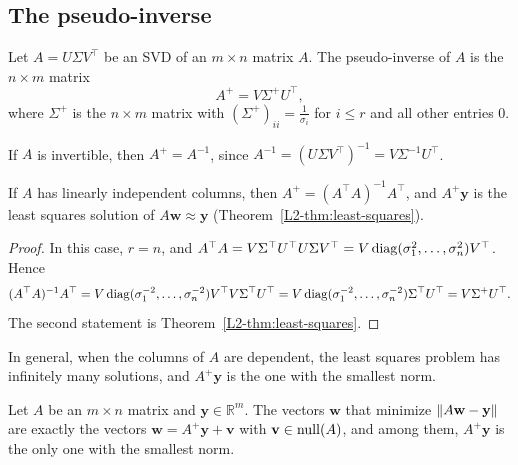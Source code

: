 \subsection{The pseudo-inverse}

\begin{definition}
    Let $A = U\Sigma V^\top$ be an SVD of an $m \times n$ matrix $A$. The pseudo-inverse of $A$ is the $n \times m$ matrix
    \[A^+ = V \Sigma^+ U^\top,\]
    where $\Sigma^+$ is the $n \times m$ matrix with $(\Sigma^+)_{ii} = \frac{1}{\sigma_i}$ for $i \leq r$ and all other entries $0$.
\end{definition}

If $A$ is invertible, then $A^+ = A^{-1}$, since $A^{-1} = (U\Sigma V^\top)^{-1} = V\Sigma^{-1}U^\top$.

\begin{proposition}\label{L2-prop:pinv}
    If $A$ has linearly independent columns, then $A^+ = (A^\top A)^{-1} A^\top$, and $A^+ \mathbf{y}$ is the least squares solution of $A\mathbf{w} \approx \mathbf{y}$ (Theorem~\ref{L2-thm:least-squares}).
\end{proposition}

\begin{proof}
    In this case, $r = n$, and $A^\top A = V\Sigma^\top U^\top U \Sigma V^\top = V \operatorname{diag}(\sigma_1^2, \ldots, \sigma_n^2) V^\top$. Hence
    \[(A^\top A)^{-1} A^\top = V \operatorname{diag}(\sigma_1^{-2}, \ldots, \sigma_n^{-2}) V^\top V \Sigma^\top U^\top = V \operatorname{diag}(\sigma_1^{-2}, \ldots, \sigma_n^{-2}) \Sigma^\top U^\top = V \Sigma^+ U^\top.\]
    The second statement is Theorem~\ref{L2-thm:least-squares}.
\end{proof}

In general, when the columns of $A$ are dependent, the least squares problem has infinitely many solutions, and $A^+\mathbf{y}$ is the one with the smallest norm.

\begin{proposition}\label{L2-prop:pinv-min-norm}
    Let $A$ be an $m \times n$ matrix and $\mathbf{y} \in \mathbb{R}^m$. The vectors $\mathbf{w}$ that minimize $\lVert A\mathbf{w} - \mathbf{y} \rVert$ are exactly the vectors $\mathbf{w} = A^+\mathbf{y} + \mathbf{v}$ with $\mathbf{v} \in \operatorname{null}(A)$, and among them, $A^+\mathbf{y}$ is the only one with the smallest norm.
\end{proposition}

